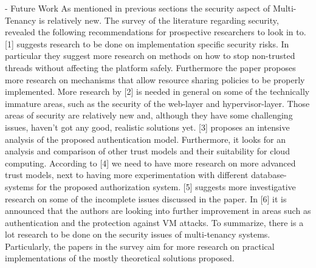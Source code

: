 - Future Work
As mentioned in previous sections the security aspect of Multi-Tenancy is relatively new. The survey of the literature regarding security, revealed the following recommendations for prospective researchers to look in to. [1] suggests research to be done on implementation specific security risks. In particular they suggest more research on methods on how to stop non-trusted threads without affecting the platform safely. Furthermore the paper proposes more research on mechanisms that allow resource sharing policies to be properly implemented. More research by [2] is needed in general on some of the technically immature areas, such as the security of the web-layer and hypervisor-layer. Those areas of security are relatively new and, although they have some challenging issues, haven't got any good, realistic solutions yet. [3] proposes an intensive analysis of the proposed authentication model. Furthermore, it looks for an analysis and comparison of other trust models and their suitability for cloud computing. According to [4] we need to have more research on more advanced trust models, next to having more experimentation with different database-systems for the proposed authorization system. [5] suggests more investigative research on some of the incomplete issues discussed in the paper. In [6] it is announced that the authors are looking into further improvement in areas such as authentication and the protection against VM attacks. To summarize, there is a lot research to be done on the security issues of multi-tenancy systems. Particularly, the papers in the survey aim for more research on practical implementations of the mostly theoretical solutions proposed.
